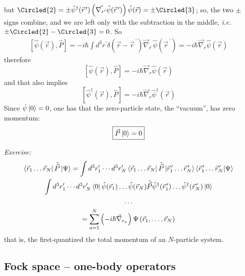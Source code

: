 \documentclass[12pt]{article}
\newcommand{\be}{\begin{equation}}
\newcommand{\ee}{\end{equation}}
\newcommand{\vecrp}{\ensuremath{\vec{r}^{\,\prime}}}
\newcommand{\vecnr}{\ensuremath{\vec{\nabla}_{\!r}}}
\begin{document}
but $\Circled{2} = \pm \hat{\psi}^{\dagger}(\vecrp) \left(\vec{\nabla_{r^\prime}}\hat{\psi}(\vecrp)\right) \hat{\psi}(\vec{r}) = \pm\Circled{3}$; so, the two $\pm$ signs combine, and we are left only with the subtraction in the middle,
\textit{i.e.} $\pm \Circled{2} - \Circled{3} = 0$. So
\[
\begin{gathered}
\left[\hat{\psi}(\vec{r}),\hat{P}\right]
= -i\hbar \int d^3r^\prime \delta(\vec{r}-\vecrp) \vec{\nabla}_{r^\prime} \hat{\psi}(\vecrp) = 
-i\hbar \vecnr \hat{\psi}(\vec{r})
\end{gathered}
\]
therefore %
\setcounter{equation}{70}
\be
\left[\hat{\psi}(\vec{r}),\hat{P}\right] = -i\hbar \vecnr \hat{\psi}(\vec{r})
\ee
and that also implies
\be
\left[\hat{\psi}^\dagger(\vec{r}),\hat{P}\right] = -i\hbar \vecnr \hat{\psi}^\dagger(\vec{r})
\ee
Since $\hat{\psi}\ket{0} = 0$, one has that the zero-particle
state, the ``vacuum'', has zero momentum:
\be
\boxed{\vec{P}\ket{0}=0}
\ee

\emph{Exercise:}
\be
\begin{gathered}
\bra{\vec{r}_1\ldots\vec{r}_N} \hat{\vec{P}}\ket{\Psi} =
\int d^{3} r_{1}^{\prime} \cdots d^{3} r_{N}^{\prime}
\bra{\vec{r}_1\ldots\vec{r}_N} \hat{\vec{P}} \ket{\vec{r}_1^{\,\prime}\ldots\vec{r}_N^{\,\prime}}
\bra{\vec{r}_1^{\,\prime}\ldots\vec{r}_N^{\,\prime}}\ket{\Psi}\\
\int d^{3} r_{1}^{\prime} \cdots d^{3} r_{N}^{\prime}
\bra{0}\hat{\psi}(\vec{r}_1)\ldots\hat{\psi}(\vec{r}_N)
\hat{\vec{P}}
\hat{\psi}^\dagger(\vec{r}_1^{\,\prime})\ldots\hat{\psi}^\dagger(\vec{r}_N^{\,\prime})\ket{0}\\
\ldots\\
=\sum_{a=1}^{N}\left(-i \hbar \vec{\nabla}_{r_{a}}\right) \Psi\left(\vec{r}_{1}, \ldots, \vec{r}_{N}\right)
\end{gathered}
\ee
that is, the first-quantized the total momentum of an $N$-particle system.

\subsection{Fock space -- one-body operators}
\end{document}
